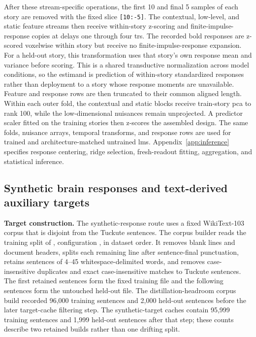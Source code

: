 After these stream-specific operations, the first 10 and final 5 samples of each story are removed with the fixed slice \texttt{[10:-5]}.
The contextual, low-level, and static feature streams then receive within-story z-scoring and finite-impulse-response copies at delays one through four \acp{tr}.
The recorded \ac{bold} responses are z-scored voxelwise within story but receive no finite-impulse-response expansion.
For a held-out story, this transformation uses that story's own response mean and variance before scoring.
This is a shared transductive normalization across model conditions, so the estimand is prediction of within-story standardized responses rather than deployment to a story whose response moments are unavailable.
Feature and response rows are then truncated to their common aligned length.
Within each outer fold, the contextual and static blocks receive train-story \ac{pca} to rank 100, while the low-dimensional nuisances remain unprojected.
A predictor scaler fitted on the training stories then z-scores the assembled design.
The same folds, nuisance arrays, temporal transforms, and response rows are used for trained and architecture-matched untrained \acp{lm}. 
Appendix~\ref{app:inference} specifies response centering, ridge selection, fresh-readout fitting, aggregation, and statistical inference.

\subsection{Synthetic brain responses and text-derived auxiliary targets}

\noindent\textbf{Target construction.}
The synthetic-response route uses a fixed WikiText-103 corpus that is disjoint from the Tuckute sentences.
The corpus builder reads the training split of , configuration , in dataset order.
It removes blank lines and document headers, splits each remaining line after sentence-final punctuation, retains sentences of 4--45 whitespace-delimited words, and removes case-insensitive duplicates and exact case-insensitive matches to Tuckute sentences.
The first retained sentences form the fixed training file and the following sentences form the untouched held-out file.
The distillation-headroom corpus build recorded 96,000 training sentences and 2,000 held-out sentences before the later target-cache filtering step.
The synthetic-target caches contain 95,999 training sentences and 1,999 held-out sentences after that step; these counts describe two retained builds rather than one drifting split. 

